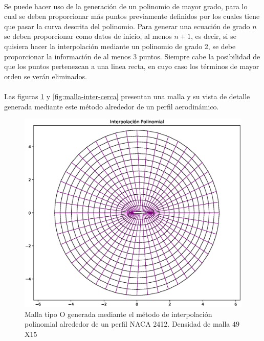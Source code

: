 \documentclass[letterpaper, openright, 12pt]{book}
\begin{document}
			\paragraph*{}
				Se puede hacer uso de la generación de un polinomio de mayor grado, para lo cual se deben proporcionar más puntos previamente definidos por los cuales tiene que pasar la curva descrita del polinomio. Para generar una ecuación de grado $n$ se deben proporcionar como datos de inicio, al menos $n+1$, es decir, si se quisiera hacer la interpolación mediante un polinomio de grado 2, se debe proporcionar la información de al menos 3 puntos. Siempre cabe la posibilidad de que los puntos pertenezcan a una linea recta, en cuyo caso los términos de mayor orden se verán eliminados.
			\paragraph*{}
				Las figuras \ref{fig:malla-inter} y \ref{fig:malla-inter-cerca} presentan una malla y su vista de detalle generada mediante este método alrededor de un perfil aerodinámico.				
				\begin{figure}[htbp!]
					\centering
					\includegraphics[width=120mm]{./Imagenes/M-inter_pol}
					\captionsetup{justification=centering, margin=2cm}
					\caption[Malla Interpolación Polinomial]{Malla tipo O generada mediante el método de interpolación polinomial alrededor de un perfil NACA 2412. Densidad de malla $49$X$15$}
					\label{fig:malla-inter}
				\end{figure}
\end{document}

